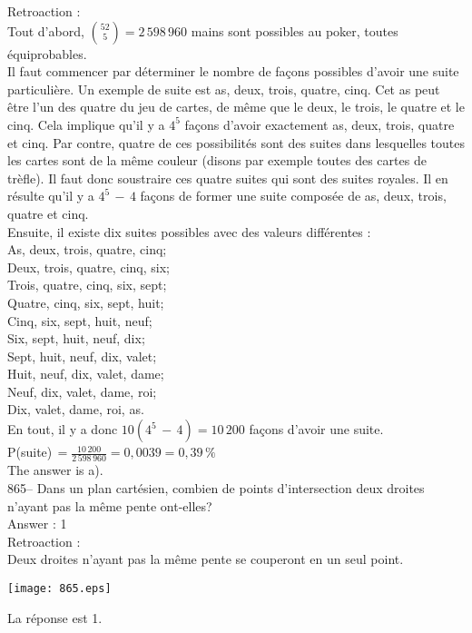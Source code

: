 ﻿\documentclass[letterpaper, 12pt]{article}
\begin{document}
Retroaction : \\
Tout d'abord, $\binom{52}{5}=2\,598\,960$ mains sont possibles au poker,
toutes \'equiprobables.  \\
Il faut commencer par d\'eterminer le nombre de fa\c cons possibles d'avoir
une suite particuli\`ere.  Un exemple de suite est as, deux, trois, quatre,
cinq.  Cet as peut \^etre l'un des quatre du jeu de cartes, de m\^eme que le
deux, le trois, le quatre et le cinq.  Cela implique qu'il y a $4^{5}$ fa\c
cons d'avoir exactement as, deux, trois, quatre et cinq.  Par contre, quatre
de ces possibilit\'es sont des suites dans lesquelles toutes les cartes sont
de la m\^eme couleur (disons par exemple toutes des cartes de tr\`efle).  Il
faut donc soustraire ces quatre suites qui sont des suites royales.  Il en
r\'esulte qu'il y a $4^{5}\,-\,4$ fa\c cons de former une suite compos\'ee
de as, deux, trois, quatre et cinq.  \\
Ensuite, il existe dix suites possibles avec des valeurs diff\'erentes :\\
As, deux, trois, quatre, cinq;\\
Deux, trois, quatre, cinq, six;\\
Trois, quatre, cinq, six, sept;\\
Quatre, cinq, six, sept, huit;\\
Cinq, six, sept, huit, neuf;\\
Six, sept, huit, neuf, dix;\\
Sept, huit, neuf, dix, valet;\\
Huit, neuf, dix, valet, dame;\\
Neuf, dix, valet, dame, roi;\\
Dix, valet, dame, roi, as.\\

En tout, il y a donc $10(4^{5}\,-\,4)=10\,200$ fa\c cons d'avoir une suite.
\\[2mm]
P(suite)$\,=\frac{10\,200}{2\,598\,960}=0,0039=0,39\,\%$\\[2mm]
The answer is a).\\

865-- Dans un plan cart\'esien, combien de points d'intersection deux
droites n'ayant pas la m\^eme pente ont-elles?\\

Answer : 1\\

Retroaction : \\
Deux droites n'ayant pas la m\^eme pente se couperont en un seul
point.   \begin{center}
    \texttt{[image: 865.eps]}
    \end{center}  La
r\'eponse est 1.\\
\end{document}
